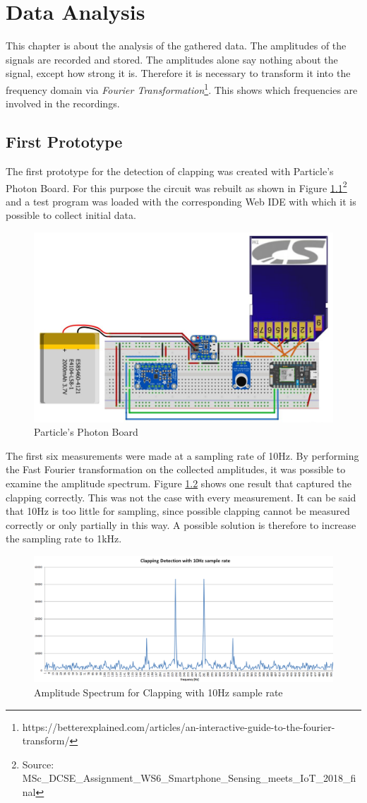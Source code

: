 \chapter{Data Analysis}
This chapter is about the analysis of the gathered data. The amplitudes of the signals are recorded and stored. The amplitudes alone say nothing about the signal, except how strong it is. Therefore it is necessary to transform it into the frequency domain via \textit{Fourier Transformation}\footnote{https://betterexplained.com/articles/an-interactive-guide-to-the-fourier-transform/}. This shows which frequencies are involved in the recordings. 
\section{First Prototype}
The first prototype for the detection of clapping was created with Particle's Photon Board. For this purpose the circuit was rebuilt as shown in Figure \ref{fig:photonBoard}\footnote{Source: MSc\_DCSE\_Assignment\_WS6\_Smartphone\_Sensing\_meets\_IoT\_2018\_final} and a test program was loaded with the corresponding Web IDE with which it is possible to collect initial data.
\begin{figure}[h]
	\centering
	\includegraphics[width=.7\textwidth]{imgs/particleBoard}
	\caption{Particle's Photon Board}
	\label{fig:photonBoard}
\end{figure}
\newpage
The first six measurements were made at a sampling rate of 10Hz. By performing the Fast Fourier transformation on the collected amplitudes, it was possible to examine the amplitude spectrum. Figure \ref{fig:clapping10Hz} shows one result that captured the clapping correctly. This was not the case with every measurement. It can be said that 10Hz is too little for sampling, since possible clapping cannot be measured correctly or only partially in this way. A possible solution is therefore to increase the sampling rate to 1kHz. \newpage
\begin{figure}[h]
	\centering
	\includegraphics[width=\textwidth]{imgs/clapping10Hz}
	\caption{Amplitude Spectrum for Clapping with 10Hz sample rate}
	\label{fig:clapping10Hz}
\end{figure}
